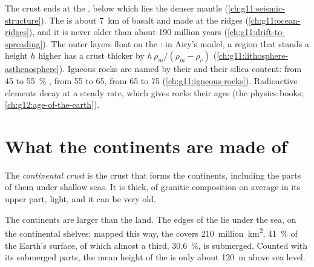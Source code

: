 \begin{recall}
The crust ends at the , below which lies the denser mantle
(\cref{ch:g11:seismic-structure}). The  is about \qty{7}{km} of
basalt and  made at the ridges (\cref{ch:g11:ocean-ridges}), and it is
never older than about 190 million years (\cref{ch:g11:drift-to-spreading}).
The outer layers float on the : in Airy's model, a region that
stands a height $h$ higher has a crust thicker by $h\,\rho_m/(\rho_m -
\rho_c)$ (\cref{ch:g11:lithosphere-asthenosphere}). Igneous rocks are named
by their  and their silica content:  from 45 to
\qty{55}{\percent} ,  from 55 to 65,  from 65 to
75 (\cref{ch:g11:igneous-rocks}). Radioactive elements decay at a steady
rate, which gives rocks their ages (the physics books;
\cref{ch:g12:age-of-the-earth}).
\end{recall}

\section{What the continents are made of}

\begin{definition}\label{def:g12:continental-crust:continental-crust}
The \emph{continental crust} is the crust that
forms the continents, including the parts of them under shallow seas. It is
thick, of granitic composition on average in its upper part, light, and it
can be very old.
\end{definition}

The continents are larger than the land. The edges of the 
lie under the sea, on the continental shelves: mapped this way, the
 covers \num{210}~million~\unit{km^2}, \qty{41}{\percent} of the
Earth's surface, of which almost a third, \qty{30.6}{\percent}, is
submerged. Counted with its submerged parts, the mean height of the
 is only about \qty{120}{m} above sea level.

